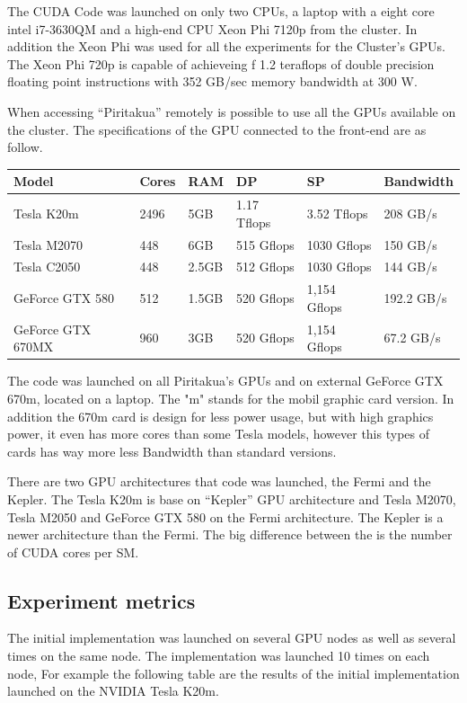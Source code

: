  The CUDA Code was launched on only two CPUs, a laptop with a eight core intel i7-3630QM and a high-end CPU Xeon Phi 7120p from the cluster. In addition the Xeon Phi was used for all the experiments for the Cluster's GPUs. The Xeon Phi 720p is capable of achieveing f 1.2 teraflops of double precision floating point instructions with 352 GB/sec memory bandwidth at 300 W.

When accessing ``Piritakua'' remotely is possible to use all the GPUs available on the cluster.
 The specifications of the GPU connected to the front-end are as follow.

  \begin{tabular}{ |  l  |  l  |  l  |  l  |  l  | l | }
    \hline
    Model & Cores & RAM & DP & SP & Bandwidth \\
    \hline
    Tesla K20m & 2496 & 5GB & 1.17 Tflops & 3.52 Tflops & 208 GB/s \\
   \hline
    Tesla M2070 & 448 & 6GB & 515 Gflops & 1030 Gflops & 150 GB/s \\
   \hline
     Tesla C2050 & 448 & 2.5GB & 512 Gflops & 1030 Gflops & 144 GB/s \\
   \hline
      GeForce GTX 580 & 512 & 1.5GB & 520 Gflops & 1,154 Gflops & 192.2 GB/s \\
   \hline
   GeForce GTX 670MX & 960 & 3GB & 520 Gflops & 1,154 Gflops & 67.2 GB/s \\
   \hline
  \end{tabular}

   The code was launched on all Piritakua's GPUs and on external GeForce GTX 670m, located on a laptop. The "m" stands for the mobil graphic card version. In addition the 670m card is design for less power usage, but with high graphics power, it even has more cores than some Tesla models, however this types of cards has way more less Bandwidth than standard versions.

There are two GPU architectures that code was launched, the Fermi and the Kepler. The Tesla K20m is base on ``Kepler'' GPU architecture and Tesla M2070, Tesla M2050 and GeForce GTX 580 on the Fermi architecture. The Kepler is a newer architecture than the Fermi. The big difference between the is the number of CUDA cores per SM.


\subsection{Experiment metrics}

The initial implementation was launched on several GPU nodes as well as several times on the same node. The implementation was launched 10 times on each node, For example the following table are the results of the initial implementation launched on the NVIDIA Tesla K20m.

